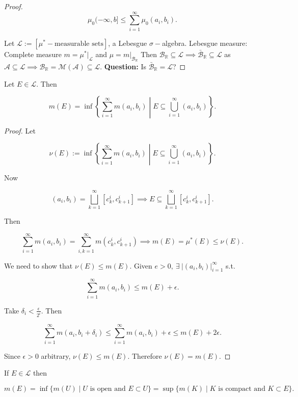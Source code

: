 \documentclass{functionspaces}
\begin{document}
\begin{proof}
\[
\mu_{0}(-\infty,b] \leq \sum_{i=1}^{\infty} \mu_{0}(a_{i},b_{i}).
\]

Let $\mathcal{L} := [\mu^{*}-\text{measurable sets}]$, a Lebesgue $\sigma-$algebra. Lebesgue measure: Complete measure $m = \mu^{*}|_{\mathcal{L}}$ and $\mu = m|_{\mathcal{B}_{\mathbb{R}}}$ Then $\mathcal{B}_{\mathbb{R}} \subseteq \mathcal{L} \implies \bar{\mathcal{B}}_{\mathbb{R}} \subseteq \mathcal{L}$ as $\mathcal{A} \subseteq \mathcal{L} \implies \mathcal{B}_{\mathbb{R}} = \mathcal{M}(\mathcal{A}) \subseteq \mathcal{L}$. \textbf{Question:} Is $\bar{\mathcal{B}}_{\mathbb{R}} = \mathcal{L}$?
\end{proof}

\begin{proposition}
Let $E \in \mathcal{L}$. Then

\[
m(E) = \inf\left\{\sum_{i=1}^{\infty} m(a_{i},b_{i}) \middle| E \subseteq \bigcup_{i=1}^{\infty} (a_{i},b_{i})\right\}.
\]
\end{proposition}

\begin{proof}
Let

\[
\nu(E) := \inf\left\{\sum_{i=1}^{\infty} m(a_{i},b_{i}) \middle| E \subseteq \bigcup_{i=1}^{\infty} (a_{i},b_{i})\right\}.
\]

Now

\[
(a_{i},b_{i}) = \bigsqcup_{k=1}^{\infty} [c_{k}^{i},c_{k+1}^{i}] \implies E \subseteq \bigsqcup_{k=1}^{\infty} [c_{k}^{i},c_{k+1}^{i}].
\]

Then

\[
\sum_{i=1}^{\infty} m(a_{i},b_{i}) = \sum_{i,k=1}^{\infty} m(c^{i}_{k},c^{i}_{k+1}) \implies m(E) = \mu^{*}(E) \leq \nu(E).
\]

We need to show that $\nu(E) \leq m(E)$. Given $e > 0,\ \exists\ |(a_{i},b_{i})|_{i=1}^{\infty}$ s.t.

\[
\sum_{i=1}^{\infty} m(a_{i},b_{i}) \leq m(E) + \epsilon.
\]

Take $\delta_{i} < \frac{\epsilon}{2^{i}}$. Then

\[
\sum_{i=1}^{\infty} m(a_{i},b_{i} + \delta_{i}) \leq \sum_{i=1}^{\infty} m(a_{i},b_{i}) + \epsilon \leq m(E) + 2\epsilon.
\]

Since $\epsilon > 0$ arbitrary, $\nu(E) \leq m(E)$. Therefore $\nu(E) = m(E)$.
\end{proof}

\begin{theorem}
If $E \in \mathcal{L}$ then

\[
m(E) = \inf\{m(U) \mid U \text{ is open and } E \subset U\} = \sup\{m(K) \mid K \text{ is compact and } K \subset E\}.
\]
\end{theorem}
\end{document}
